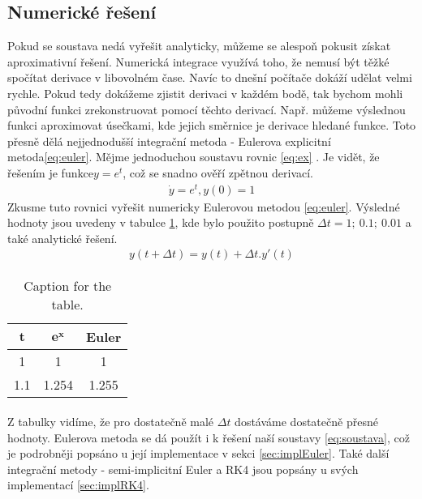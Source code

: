 \subsection{Numerické řešení}
Pokud se soustava nedá vyřešit analyticky, můžeme se alespoň pokusit získat aproximativní řešení. Numerická integrace využívá toho, že nemusí být těžké spočítat derivace v libovolném čase. Navíc to dnešní počítače dokáží udělat velmi rychle. Pokud tedy dokážeme zjistit derivaci v každém bodě, tak bychom mohli původní funkci zrekonstruovat pomocí těchto derivací. Např. můžeme výslednou funkci aproximovat úsečkami, kde jejich směrnice je derivace hledané funkce. Toto přesně dělá nejjednodušší integrační metoda - Eulerova explicitní metoda\eqref{eq:euler}.
Mějme jednoduchou soustavu rovnic \eqref{eq:ex} . Je vidět, že řešením je funkce$ y=e^t $, což se snadno ověří zpětnou derivací. 
\begin{align} \label{eq:ex}
\dot	y = e^t, y(0)=1
\end{align}
Zkusme tuto rovnici vyřešit numericky Eulerovou metodou \eqref{eq:euler}. 
Výsledné hodnoty jsou uvedeny v tabulce \ref{tab:numer}, kde bylo použito postupně $ \Delta t = 1;\> 0.1;\> 0.01$ a také analytické řešení.
\begin{align} \label{eq:euler}
	y(t+\Delta t) = y(t) + \Delta t . y'(t)
\end{align}
\begin{table}[h!]
	\centering
	\label{tab:numer}
	\begin{tabular}{c||c|c}
	$ \boldsymbol t $ & $\boldsymbol{ e^x} $  &\textbf{	 Euler}\\
		
		\hline
		1 & 1 & 1\\
		1.1 & 1.254 & 1.255
	\end{tabular}
\caption{Caption for the table.}
\end{table}
\paragraph{}
Z tabulky vidíme, že pro dostatečně malé $ \Delta t$ dostáváme dostatečně přesné hodnoty.
Eulerova metoda se dá použít i k řešení naší soustavy \eqref{eq:soustava}, což je podrobněji popsáno u její implementace v sekci \ref{sec:implEuler}. Také další integrační metody - semi-implicitní Euler a RK4 jsou popsány u svých implementací \ref{sec:implRK4}.










